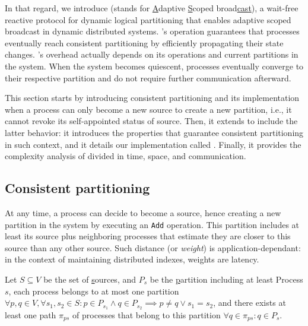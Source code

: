 \noindent In that regard, we introduce \NAME (stands for
\underline{A}daptive \underline{S}coped broad\underline{cast}), a
wait-free reactive protocol for dynamic logical partitioning that
enables adaptive scoped broadcast in dynamic distributed
systems. \NAME's operation guarantees that processes eventually reach
consistent partitioning by efficiently propagating their state
changes. \NAME's overhead actually depends on its operations and
current partitions in the system. When the system becomes quiescent,
processes eventually converge to their respective partition and do not
require further communication afterward.

\noindent This section starts by introducing consistent partitioning
and its implementation when a process can only become a new source to
create a new partition, i.e., it cannot revoke its self-appointed
status of source. Then, it extends to include the latter behavior: it
introduces the properties that guarantee consistent partitioning in
such context, and it details our implementation called \NAME. Finally,
it provides the complexity analysis of \NAME divided in time, space,
and communication.


\subsection{Consistent partitioning}

At any time, a process can decide to become a source, hence creating a
new partition in the system by executing an \texttt{Add}
operation. This partition includes at least its source plus
neighboring processes that estimate they are closer to this source
than any other source. Such distance (or \emph{weight}) is
application-dependant: in the context of maintaining distributed
indexes, weights are latency.


\begin{definition}
  Let $S \subseteq V$ be the set of \underline{s}ources, and $P_s$ be
  the \underline{p}artition including at least Process $s$, each
  process belongs to at most one partition $\forall p,q \in V, \forall
  s_1,s_2 \in S: p \in P_{s_1} \wedge q \in P_{s_2} \implies p \neq q
  \vee s_1 = s_2$, and there exists at least one path $\pi_{ps}$ of
  processes that belong to this partition $\forall q \in \pi_{ps}: q
  \in P_s$.
\end{definition}

